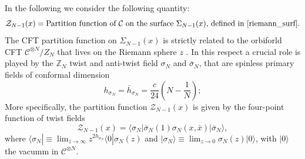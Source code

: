 \documentclass[a4paper,11pt]{article}
\begin{document}
\noindent In the following we consider the following quantity:
\begin{equation}
\mathcal{Z}_{N-1}(x)=\text{Partition function of $\mathcal{C}$ on the surface  $\Sigma_{N-1}(x)$, defined in \ref{riemann_surf}}.
 \end{equation}
The CFT partition function on $\Sigma_{N-1}(x)$ is strictly related to the orbiforld CFT $\mathcal{C}^{\otimes N}/Z_N$ that lives on the Riemann sphere $z$ \cite{Dixon, Knizhnik}. In this respect a crucial role is played by the $\mathbb Z_N$ twist and anti-twist field $\sigma_N$ and $\bar{\sigma}_N$, that are  spinless primary fields of conformal dimension~\cite{Knizhnik}
\begin{equation}
 h_{\sigma_N}=\bar{h}_{\sigma_N}=\frac{c}{24}\left(N-\frac{1}{N}\right);
\end{equation}
\noindent More specifically, the partition function $\mathcal{Z}_{N-1}(x)$ is given by the four-point function of twist fields  
\begin{equation}
\mathcal{Z}_{N-1}(x)=\langle \sigma_N| \bar{\sigma}_N(1)\sigma_N(x,\bar{x})|\bar{\sigma}_N\rangle,
 \end{equation}
where $\langle \sigma_N |\equiv\lim_{z\rightarrow\infty}z^{2h_{\sigma_{N}}}\langle 0|\sigma_N(z)$ and $|\sigma_{N}\rangle\equiv\lim_{z\rightarrow 0}\sigma_{N}(z)|0\rangle$, with $|0\rangle$ the vacumm in $\mathcal{C}^{\otimes N}$.
\end{document}
